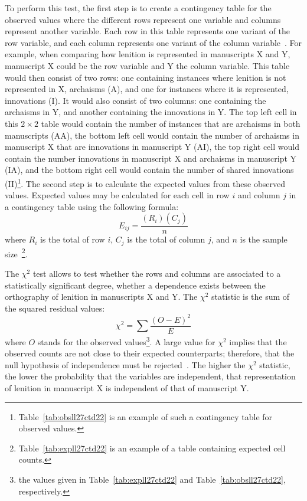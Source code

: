 To perform this test, the  first step is to create a contingency table for the observed values where the different rows represent one variable and columns represent another variable. Each row in this table represents one variant of the row variable, and each column represents one variant of the column variable~\autocite[754]{MS_Statistics09}.
For example, when comparing how lenition is represented in manuscripts X and Y, manuscript X could be the row variable and Y the column variable. This table would then consist of two rows: one containing instances where lenition is not represented in X, \ie archaisms (A), and one for instances where it is represented, \ie innovations (I).  It would also consist of two columns: one containing the archaisms in Y, and another containing the innovations in Y. The top left cell in this \(2 \times 2\) table would contain the number of instances that are archaisms in both manuscripts (AA), the bottom left cell would contain the number of archaisms in manuscript X that are innovations in manuscript Y (AI), the top right cell would contain the number innovations in manuscript X and archaisms in manuscript Y (IA), and the bottom right cell would contain the number of shared innovations (II)\footnote{Table~\ref{tab:obsll27ctd22} is an example of such a contingency table for observed values.}.
The second step is to calculate the expected values from these observed values. Expected values may be calculated for each cell in row \(i\) and column \(j\) in a contingency table using the following formula:
\[E_{ij}=\frac{(R_i)(C_j)}{n}\]
where \(R_i\) is the total of row \(i\), \(C_j\) is the total of column \(j\), and \(n\) is the sample size~\autocite[755--756]{MS_Statistics09}\footnote{ Table~\ref{tab:expll27ctd22} is an example of a table containing expected cell counts.}.

The \(\chi^2\) test allows to test whether the rows and columns are associated to a statistically significant degree, \ie whether a dependence exists between the orthography of lenition in manuscripts X and Y. The \(\chi^2\) statistic is the sum of the squared residual values:
\[\chi^2=\sum{\frac{(O-E)^2}{E}}\]
where \(O\) stands for the observed values\footnote{\eg the values given in Table~\ref{tab:expll27ctd22} and Table~\ref{tab:obsll27ctd22}, respectively.}. A large value for \(\chi^2\) implies that the observed counts are not close to their expected counterparts; therefore, that the null hypothesis of independence must be rejected~\autocite[756--757]{MS_Statistics09}. The higher the \(\chi^2\) statistic, the lower the probability that the variables are independent, \eg that representation of lenition in manuscript X is independent of that of manuscript Y.


